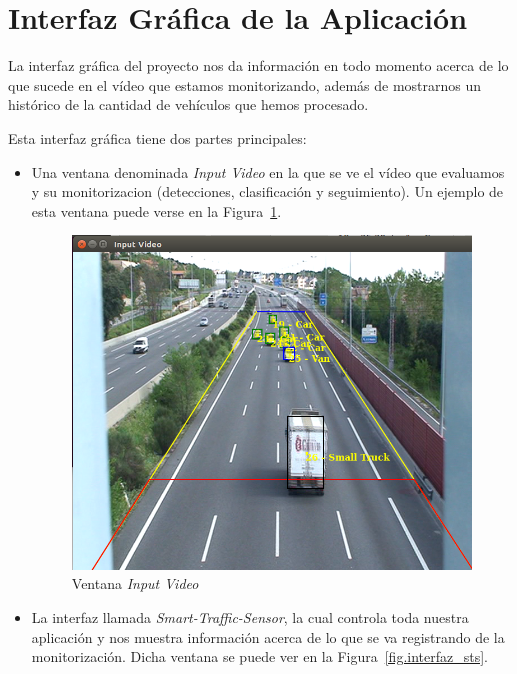 \section{Interfaz Gráfica de la Aplicación}

La interfaz gráfica del proyecto nos da información en todo momento acerca de lo que sucede en el vídeo que estamos monitorizando, además de mostrarnos un histórico de la cantidad de vehículos que hemos procesado.

Esta interfaz gráfica tiene dos partes principales:
\begin{itemize}
    \item Una ventana denominada \textit{Input Video} en la que se ve el vídeo que evaluamos y su monitorizacion (detecciones, clasificación y seguimiento). Un ejemplo de esta ventana puede verse en la Figura~\ref{fig.input_video}.
     \begin{figure}[H] 
    \begin{center}
    	\includegraphics[scale=0.4]{figures/Diseno_global/sts_buena.png}
       \caption{Ventana \textit{Input Video}}
    	\label{fig.input_video}
    \end{center}
    \end{figure}
    \item La interfaz llamada \textit{Smart-Traffic-Sensor}, la cual controla toda nuestra aplicación y nos muestra información acerca de lo que se va registrando de la monitorización. Dicha ventana se puede ver en la Figura~\ref{fig.interfaz_sts}.
     \begin{figure}[H] 

\end{figure}
\end{itemize}
